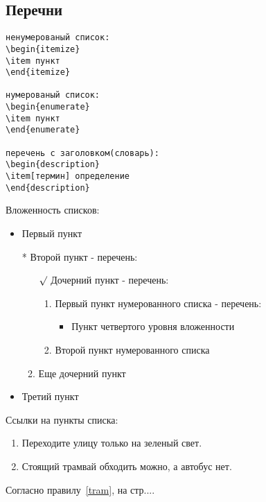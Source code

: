 \documentclass[a4paper,12pt]{article}%
\theoremstyle{plain}%
\theoremstyle{definition}%
\theoremstyle{remark}%
\begin{document}
\subsection{Перечни}

\begin{verbatim}
ненумерованый список:
\begin{itemize}
\item пункт
\end{itemize}

нумерованый список:
\begin{enumerate}
\item пункт
\end{enumerate}

перечень с заголовком(словарь):
\begin{description}
\item[термин] определение
\end{description}
\end{verbatim}

\noindent Вложенность списков:
\begin{itemize}
\item Первый пункт
\item[*] Второй пункт - перечень: \begin{enumerate}
\item[$\surd$] Дочерний пункт - перечень: \begin{enumerate}
\item Первый пункт нумерованного списка - перечень: \begin{itemize}
\item Пункт четвертого уровня вложенности
\end{itemize}
\item Второй пункт нумерованного списка
\end{enumerate}
\item Еще дочерний пункт 
\end{enumerate}
\item Третий пункт
\end{itemize}

\noindent Ссылки на пункты списка:
\begin{enumerate}
\item Переходите улицу только на зеленый свет. \label{green}
\item Стоящий трамвай обходить можно, а автобус нет. \label{tram}
\end{enumerate}
Согласно правилу~\ref{tram}, на стр.\pageref{tram}...
\end{document}
